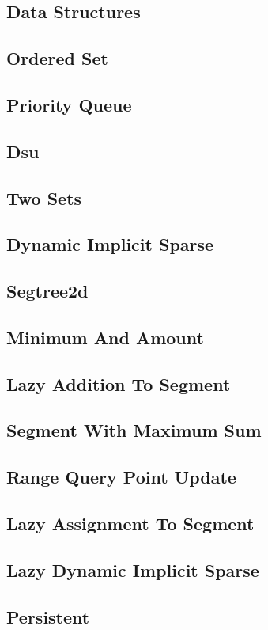 \documentclass{article}
\newcommand\includes[2]{ %
   \subsection{#1}
   
}
\begin{document}
\begin{multicols}{2}
\section{Data Structures}
\includes{Ordered Set}{Code/Data Structures/ordered_set.cpp}
\includes{Priority Queue}{Code/Data Structures/priority_queue.cpp}
\includes{Dsu}{Code/Data Structures/dsu.cpp}
\includes{Two Sets}{Code/Data Structures/two_sets.cpp}
\includes{Dynamic Implicit Sparse}{Code/Data Structures/Segtree/dynamic_implicit_sparse.cpp}
\includes{Segtree2d}{Code/Data Structures/Segtree/segtree2D.cpp}
\includes{Minimum And Amount}{Code/Data Structures/Segtree/minimum_and_amount.cpp}
\includes{Lazy Addition To Segment}{Code/Data Structures/Segtree/lazy_addition_to_segment.cpp}
\includes{Segment With Maximum Sum}{Code/Data Structures/Segtree/segment_with_maximum_sum.cpp}
\includes{Range Query Point Update}{Code/Data Structures/Segtree/range_query_point_update.cpp}
\includes{Lazy Assignment To Segment}{Code/Data Structures/Segtree/lazy_assignment_to_segment.cpp}
\includes{Lazy Dynamic Implicit Sparse}{Code/Data Structures/Segtree/lazy_dynamic_implicit_sparse.cpp}
\includes{Persistent}{Code/Data Structures/Segtree/persistent.cpp}

\end{multicols}
\end{document}
